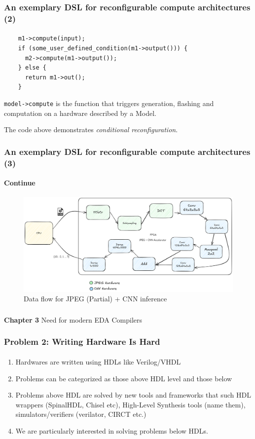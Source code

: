 \documentclass{beamer}
\begin{document}
{\begin{frame}[fragile]
  \frametitle{An exemplary DSL for reconfigurable compute architectures (2)}
\framesubtitle{}
  \begin{lstlisting}
    m1->compute(input);
    if (some_user_defined_condition(m1->output())) {
      m2->compute(m1->output());
    } else {
      return m1->out();
    }
  \end{lstlisting}
  \texttt{model->compute} is the function that triggers generation, flashing and
  computation on a hardware described by a Model.

  The code above demonstrates \textit{conditional reconfiguration}.
\end{frame}

\begin{frame}[fragile]
  \frametitle{An exemplary DSL for reconfigurable compute architectures (3)}
\framesubtitle{Continue}
   \begin{figure}
        \centering
        \includegraphics[width=1\linewidth]{images/flowcnnjpeg.png}
        \caption{Data flow for JPEG (Partial) + CNN inference}
    \end{figure}
\end{frame}


\begin{frame}[c,fragile]
  \frametitle{}

  \centering
  \textbf{Chapter 3} 
  \centering
  Need for modern EDA Compilers
\end{frame}

\newcommand\myheading[1]{%
  \par\bigskip
  {\Large\bfseries#1}\par\smallskip}

 
\begin{frame}[fragile]
  \frametitle{Problem 2: Writing Hardware Is Hard}
  \framesubtitle{}
  \begin{enumerate}
    \item Hardwares are written using HDLs like Verilog/VHDL
    \item Problems can be categorized as those above HDL level and those below
    \item Problems above HDL are solved by new tools and frameworks that
      such HDL wrappers (SpinalHDL, Chisel etc), High-Level Synthesis tools
      (name them), simulators/verifiers (verilator, CIRCT etc.)
    \item We are particularly interested in solving problems below HDLs.


\end{enumerate}
\end{frame}}
\end{document}
